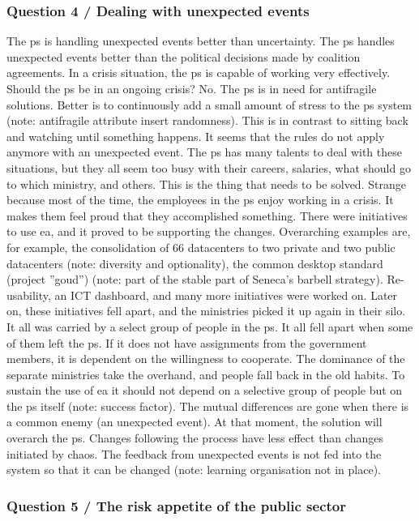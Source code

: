 \subsubsection{Question 4 / Dealing with unexpected events}
The \gls{ps} is handling unexpected events better than uncertainty. The \gls{ps} handles unexpected events better than the political decisions made by coalition agreements. In a crisis situation, the \gls{ps} is capable of working very effectively. Should the \gls{ps} be in an ongoing crisis? No. The \gls{ps} is in need for \gls{antifragile} solutions. Better is to continuously add a small amount of stress to the \gls{ps} system (note: antifragile attribute insert randomness). This is in contrast to sitting back and watching until something happens. It seems that the rules do not apply anymore with an unexpected event. The \gls{ps} has many talents to deal with these situations, but they all seem too busy with their careers, salaries, what should go to which ministry, and others. This is the thing that needs to be solved. Strange because most of the time, the employees in the \gls{ps} enjoy working in a crisis. It makes them feel proud that they accomplished something. There were initiatives to use \acrshort{ea}, and it proved to be supporting the changes. Overarching examples are, for example, the consolidation of 66 datacenters to two private and two public datacenters (note: diversity and optionality), the common desktop standard (project ''goud'') (note: part of the stable part of Seneca's barbell strategy). Re-usability, an ICT dashboard, and many more initiatives were worked on. Later on, these initiatives fell apart, and the ministries picked it up again in their silo. It all was carried by a select group of people in the \gls{ps}. It all fell apart when some of them left the \gls{ps}. If it does not have assignments from the government members, it is dependent on the willingness to cooperate. The dominance of the separate ministries take the overhand, and people fall back in the old habits. To sustain the use of \acrshort{ea} it should not depend on a selective group of people but on the \gls{ps} itself (note: success factor). The mutual differences are gone when there is a common enemy (an unexpected event). At that moment, the solution will overarch the \gls{ps}. Changes following the process have less effect than changes initiated by chaos. The feedback from unexpected events is not fed into the system so that it can be changed (note: learning organisation not in place).

\subsubsection{Question 5 / The risk appetite of the public sector}

